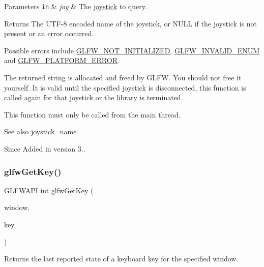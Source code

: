 \begin{DoxyParams}[1]{Parameters}
\mbox{\tt in}  & {\em joy} & The \hyperlink{group__joysticks}{joystick} to query. \\
\hline
\end{DoxyParams}
\begin{DoxyReturn}{Returns}
The U\+T\+F-\/8 encoded name of the joystick, or {\ttfamily N\+U\+LL} if the joystick is not present or an error occurred.
\end{DoxyReturn}
Possible errors include \hyperlink{group__errors_ga2374ee02c177f12e1fa76ff3ed15e14a}{G\+L\+F\+W\+\_\+\+N\+O\+T\+\_\+\+I\+N\+I\+T\+I\+A\+L\+I\+Z\+ED}, \hyperlink{group__errors_ga76f6bb9c4eea73db675f096b404593ce}{G\+L\+F\+W\+\_\+\+I\+N\+V\+A\+L\+I\+D\+\_\+\+E\+N\+UM} and \hyperlink{group__errors_gad44162d78100ea5e87cdd38426b8c7a1}{G\+L\+F\+W\+\_\+\+P\+L\+A\+T\+F\+O\+R\+M\+\_\+\+E\+R\+R\+OR}.

The returned string is allocated and freed by G\+L\+FW. You should not free it yourself. It is valid until the specified joystick is disconnected, this function is called again for that joystick or the library is terminated.

This function must only be called from the main thread.

\begin{DoxySeeAlso}{See also}
joystick\+\_\+name
\end{DoxySeeAlso}
\begin{DoxySince}{Since}
Added in version 3.. 
\end{DoxySince}
\mbox{\label{group__input_ga7d8ad8ffaf272808f04e1d5d33ec8859}} 
\subsubsection{\texorpdfstring{glfw\+Get\+Key()}{glfwGetKey()}}
{\footnotesize\ttfamily G\+L\+F\+W\+A\+PI int glfw\+Get\+Key (\begin{DoxyParamCaption}\item[{\hyperlink{group__window_ga3c96d80d363e67d13a41b5d1821f3242}{G\+L\+F\+Wwindow} $\ast$}]{window,  }\item[{int}]{key }\end{DoxyParamCaption})}



Returns the last reported state of a keyboard key for the specified window. 

